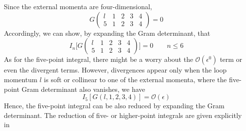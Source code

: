 \\\\
Since the external momenta are four-dimensional, 
\begin{equation*}
G\begin{pmatrix}
l & 1 & 2 & 3 & 4\\
5 & 1 & 2 & 3 & 4 
\end{pmatrix}
 = 0
\end{equation*}
Accordingly, we can show, by expanding the Gram determinant, that
\begin{equation*}
I_n\Big[G\begin{pmatrix}
l & 1 & 2 & 3 & 4\\
5 & 1 & 2 & 3 & 4 
\end{pmatrix}\Big]
 = 0
 \quad\quad n\leq 6
\end{equation*}
As for the five-point integral, there might be a worry about the $\mathcal{O}(\epsilon^0)$ term or even the divergent terms.
However, divergences appear only when the loop momentum $l$ is soft or collinear to one of the external momenta, where the five-point Gram determinant also vanishes, we have
\begin{equation*}
I_5[G(l,1,2,3,4)] = \mathcal{O}(\epsilon)
\end{equation*}
Hence, the five-point integral can be also reduced by expanding the Gram determinant.
The reduction of five- or higher-point integrals are given explicitly in~\cite{Gluza:2010ws}









